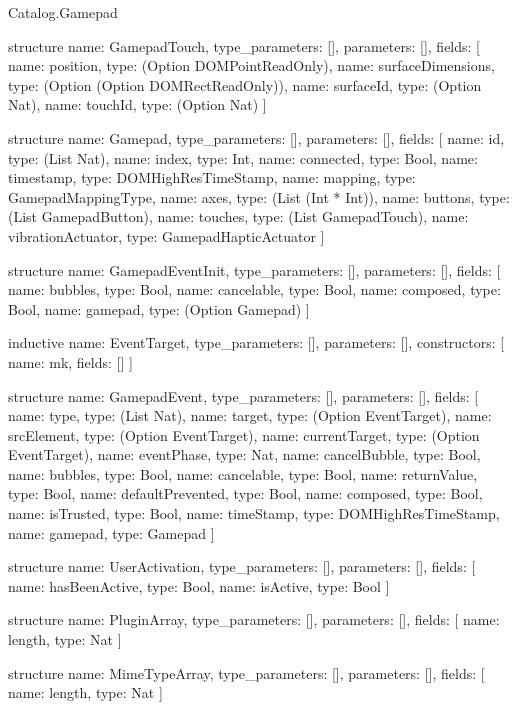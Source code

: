 \begin{lexlean}{Catalog.Gamepad}
\begin{semanticmodule}
structure{
  name: GamepadTouch,
  type_parameters: [],
  parameters: [],
  fields: [
    {name: position, type: (Option DOMPointReadOnly)},
    {name: surfaceDimensions, type: (Option (Option DOMRectReadOnly))},
    {name: surfaceId, type: (Option Nat)},
    {name: touchId, type: (Option Nat)}
  ]
}

structure{
  name: Gamepad,
  type_parameters: [],
  parameters: [],
  fields: [
    {name: id, type: (List Nat)},
    {name: index, type: Int},
    {name: connected, type: Bool},
    {name: timestamp, type: DOMHighResTimeStamp},
    {name: mapping, type: GamepadMappingType},
    {name: axes, type: (List (Int * Int))},
    {name: buttons, type: (List GamepadButton)},
    {name: touches, type: (List GamepadTouch)},
    {name: vibrationActuator, type: GamepadHapticActuator}
  ]
}

structure{
  name: GamepadEventInit,
  type_parameters: [],
  parameters: [],
  fields: [
    {name: bubbles, type: Bool},
    {name: cancelable, type: Bool},
    {name: composed, type: Bool},
    {name: gamepad, type: (Option Gamepad)}
  ]
}

inductive{
  name: EventTarget,
  type_parameters: [],
  parameters: [],
  constructors: [
    {name: mk, fields: []}
  ]
}

structure{
  name: GamepadEvent,
  type_parameters: [],
  parameters: [],
  fields: [
    {name: type, type: (List Nat)},
    {name: target, type: (Option EventTarget)},
    {name: srcElement, type: (Option EventTarget)},
    {name: currentTarget, type: (Option EventTarget)},
    {name: eventPhase, type: Nat},
    {name: cancelBubble, type: Bool},
    {name: bubbles, type: Bool},
    {name: cancelable, type: Bool},
    {name: returnValue, type: Bool},
    {name: defaultPrevented, type: Bool},
    {name: composed, type: Bool},
    {name: isTrusted, type: Bool},
    {name: timeStamp, type: DOMHighResTimeStamp},
    {name: gamepad, type: Gamepad}
  ]
}

structure{
  name: UserActivation,
  type_parameters: [],
  parameters: [],
  fields: [
    {name: hasBeenActive, type: Bool},
    {name: isActive, type: Bool}
  ]
}

structure{
  name: PluginArray,
  type_parameters: [],
  parameters: [],
  fields: [
    {name: length, type: Nat}
  ]
}

structure{
  name: MimeTypeArray,
  type_parameters: [],
  parameters: [],
  fields: [
    {name: length, type: Nat}
  ]
}


\end{semanticmodule}
\end{lexlean}
